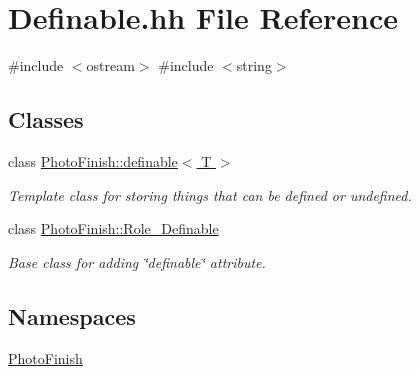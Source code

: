 \hypertarget{_definable_8hh}{}\section{Definable.\+hh File Reference}
\label{_definable_8hh}
{\ttfamily \#include $<$ostream$>$}\newline
{\ttfamily \#include $<$string$>$}\newline
\subsection*{Classes}
\begin{DoxyCompactItemize}
\item 
class \hyperlink{class_photo_finish_1_1definable}{Photo\+Finish\+::definable$<$ T $>$}
\begin{DoxyCompactList}\small\item\em Template class for storing things that can be defined or undefined. \end{DoxyCompactList}\item 
class \hyperlink{class_photo_finish_1_1_role___definable}{Photo\+Finish\+::\+Role\+\_\+\+Definable}
\begin{DoxyCompactList}\small\item\em Base class for adding \char`\"{}definable\char`\"{} attribute. \end{DoxyCompactList}\end{DoxyCompactItemize}
\subsection*{Namespaces}
\begin{DoxyCompactItemize}
\item 
 \hyperlink{namespace_photo_finish}{Photo\+Finish}
\end{DoxyCompactItemize}
